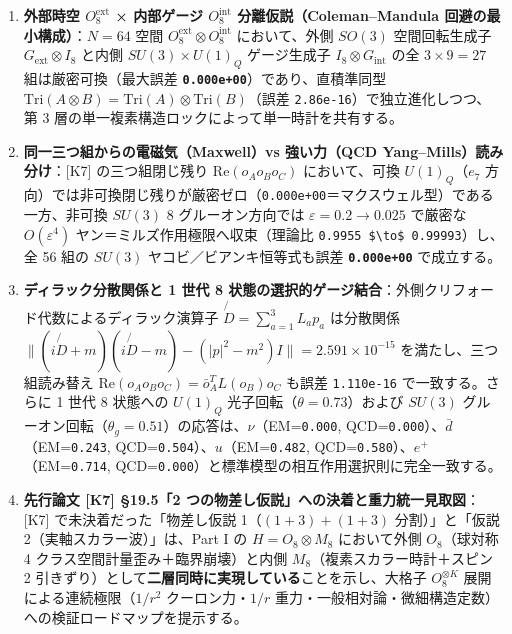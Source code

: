 \documentclass[
  a4paper,
]{ltjsarticle}
\providecommand{\tightlist}{%
  \setlength{\itemsep}{0pt}\setlength{\parskip}{0pt}}
\begin{document}
\begin{enumerate}
\def\labelenumi{\arabic{enumi}.}
\tightlist
\item
  \textbf{外部時空 \(O_8^{\mathrm{ext}}\) × 内部ゲージ
  \(O_8^{\mathrm{int}}\) 分離仮説（Coleman--Mandula
  回避の最小構成）}：\(N = 64\) 空間
  \(O_8^{\mathrm{ext}} \otimes O_8^{\mathrm{int}}\) において、外側
  \(SO(3)\) 空間回転生成子 \(G_{\mathrm{ext}} \otimes I_8\) と内側
  \(SU(3) \times U(1)_Q\) ゲージ生成子 \(I_8 \otimes G_{\mathrm{int}}\)
  の全 \(3 \times 9 = 27\) 組は厳密可換（最大誤差
  \textbf{\texttt{0.000e+00}}）であり、直積準同型
  \(\mathrm{Tri}(A\otimes B) = \mathrm{Tri}(A)\otimes\mathrm{Tri}(B)\)（誤差
  \texttt{2.86e-16}）で独立進化しつつ、第 3
  層の単一複素構造ロックによって単一時計を共有する。
\item
  \textbf{同一三つ組からの電磁気（Maxwell）vs 強い力（QCD
  Yang--Mills）読み分け}：{[}K7{]} の三つ組閉じ残り
  \(\mathrm{Re}(o_A o_B o_C)\) において、可換 \(U(1)_Q\)（\(e_7\)
  方向）では非可換閉じ残りが厳密ゼロ（\texttt{0.000e+00}＝マクスウェル型）である一方、非可換
  \(SU(3)\) 8 グルーオン方向では \(\varepsilon = 0.2 \to 0.025\)
  で厳密な \(O(\varepsilon^4)\) ヤン＝ミルズ作用極限へ収束（理論比
  \texttt{0.9955\ \$\textbackslash{}to\$\ 0.99993}）し、全 56 組の
  \(SU(3)\) ヤコビ／ビアンキ恒等式も誤差 \textbf{\texttt{0.000e+00}}
  で成立する。
\item
  \textbf{ディラック分散関係と 1 世代 8
  状態の選択的ゲージ結合}：外側クリフォード代数によるディラック演算子
  \(\not{D} = \sum_{a=1}^3 L_a p_a\) は分散関係
  \(\|(i\not{D}+m)(i\not{D}-m) - (|p|^2 - m^2)I\| = 2.591 \times 10^{-15}\)
  を満たし、三つ組読み替え
  \(\mathrm{Re}(o_A o_B o_C) = \bar{o}_A^T L(o_B) o_C\) も誤差
  \texttt{1.110e-16} で一致する。さらに 1 世代 8 状態への \(U(1)_Q\)
  光子回転（\(\theta=0.73\)）および \(SU(3)\)
  グルーオン回転（\(\theta_g=0.51\)）の応答は、\(\nu\)（EM=\texttt{0.000},
  QCD=\texttt{0.000}）、\(\bar{d}\)（EM=\texttt{0.243},
  QCD=\texttt{0.504}）、\(u\)（EM=\texttt{0.482},
  QCD=\texttt{0.580}）、\(e^+\)（EM=\texttt{0.714},
  QCD=\texttt{0.000}）と標準模型の相互作用選択則に完全一致する。
\item
  \textbf{先行論文 {[}K7{]} §19.5「2
  つの物差し仮説」への決着と重力統一見取図}：{[}K7{]}
  で未決着だった「物差し仮説 1（\((1+3)+(1+3)\) 分割）」と「仮説
  2（実軸スカラー波）」は、Part I の \(H = O_8 \otimes M_8\)
  において外側 \(O_8\)（球対称 4 クラス空間計量歪み＋臨界崩壊）と内側
  \(M_8\)（複素スカラー時計＋スピン 2
  引きずり）として\textbf{二層同時に実現している}ことを示し、大格子
  \(O_8^{\otimes K}\) 展開による連続極限（\(1/r^2\) クーロン力・\(1/r\)
  重力・一般相対論・微細構造定数）への検証ロードマップを提示する。
\end{enumerate}
\end{document}

